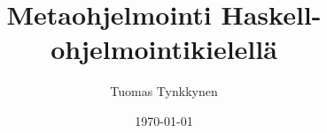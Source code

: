 \documentclass{beamer}
\title{Metaohjelmointi Haskell-ohjelmointikielellä}
\author{Tuomas Tynkkynen}
\institute{Helsingin Yliopisto}
\date{\today}
\begin{document}
\frame{\titlepage}

\begin{comment}

\begin{frame}
\frametitle{Haskell?}
    \begin{itemize}
        \item{staattisesti tyypitetty}
        \item{vahvasti tyypitetty}
        \item{laiskasti evaluoitu}
        \item{puhtaasti funktionaalinen ohjelmointikieli}
    \end{itemize}
\end{frame}

\begin{frame}[fragile]
\frametitle{Haskell-esimerkki}
\begin{verbatim}
main = do
    putStrLn "Mika on nimesi?"
    nimi <- getLine
    putStrLn (tervehdi nimi)

tervehdi hlo = "Hei, " ++ hlo ++ "!"
\end{verbatim}
\end{frame}

\begin{frame}[fragile]
\frametitle{Kontrollirakenteita - ehtolauseke}
\begin{itemize}
\item{If on lauseke (expression), ei lause (statement)}
\begin{itemize}
\item{Palauttaa aina arvon}
\item{\texttt{else}-haaraa ei voi jättää pois}
\end{itemize}
\end{itemize}

\begin{verbatim}
henkilonKuvaus ika = if ika < 18
                        then "Lapsi"
                        else "Aikuinen"
luvunKuvaus n = "Luku on " ++ (if n < 0
                                  then "negatiivinen"
                                  else "positiivinen")
\end{verbatim}

\end{frame}

\begin{frame}[fragile]
\frametitle{Kontrollirakenteita - useampi vertailu}
\begin{verbatim}
fizzbuzz n | n % 15 == 0 = "FizzBuzz"
           | n % 3 == 0  = "Fizz"
           | n % 5 == 0  = "Buzz"
           | otherwise   = show n
\end{verbatim}
\begin{itemize}
\item{Ehdot tarkistetaan ylhäältä alas-järjestyksessä}
\item{Ajonaikainen virhe jos mikään ehdoista ei täyty}
\item{\texttt{otherwise} sama kuin \texttt{True}}
\end{itemize}
\end{frame}


\end{comment}
\end{document}
